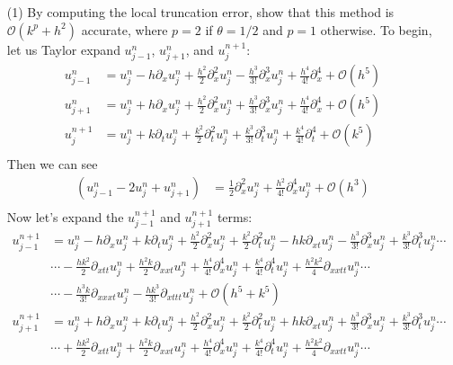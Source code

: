 \documentclass{article}
\begin{document}
\begin{itemize}
    \item[(1)] By computing the local truncation error, show that this method is $\mathcal{O}(k^p + h^2)$ accurate, where $p = 2$ if $\theta = 1/2$ and $p = 1$ otherwise.
    \newline\newline
    To begin, let us Taylor expand $u_{j-1}^n$, $u_{j+1}^n$, and $u_j^{n+1}$:
    \begin{align*}
        u_{j-1}^n &= u_j^n - h\partial_xu_j^n + \frac{h^2}{2}\partial_x^2u_j^n - \frac{h^3}{3!}\partial_x^3u_j^n + \frac{h^4}{4!}\partial_x^4 + \mathcal{O}(h^5) \\
        u_{j+1}^n &= u_j^n + h\partial_xu_j^n + \frac{h^2}{2}\partial_x^2u_j^n + \frac{h^3}{3!}\partial_x^3u_j^n + \frac{h^4}{4!}\partial_x^4 + \mathcal{O}(h^5) \\
        u_j^{n+1} &= u_j^n + k\partial_tu_j^n + \frac{k^2}{2}\partial_t^2u_j^n + \frac{k^3}{3!}\partial_t^3u_j^n + \frac{k^4}{4!}\partial_t^4 + \mathcal{O}(k^5) \\
    \end{align*}
    Then we can see
    \begin{align*}
        (u_{j-1}^n - 2u_j^n + u_{j+1}^n) &= \frac{1}{2}\partial_x^2u_j^n + \frac{h^2}{4!}\partial_x^4u_j^n + \mathcal{O}(h^3) \\
    \end{align*}
    Now let's expand the $u_{j-1}^{n+1}$ and $u_{j+1}^{n+1}$ terms:
    \begin{align*}
        u_{j-1}^{n+1} &= u_j^n - h\partial_xu_j^n + k\partial_tu_j^n + \frac{h^2}{2}\partial_x^2u_j^n + \frac{k^2}{2}\partial_t^2u_j^n - hk\partial_{xt}u_j^n - \frac{h^3}{3!}\partial_x^3u_j^n + \frac{k^3}{3!}\partial_t^3u_j^n \cdots \\
        &\cdots - \frac{hk^2}{2}\partial_{xtt}u_j^n + \frac{h^2k}{2}\partial_{xxt}u_j^n + \frac{h^4}{4!}\partial_x^4u_j^n + \frac{k^4}{4!}\partial_t^4u_j^n + \frac{h^2k^2}{4}\partial_{xxtt}u_j^n \cdots \\
        &\cdots - \frac{h^3k}{3!}\partial_{xxxt}u_j^n - \frac{hk^3}{3!}\partial_{xttt}u_j^n + \mathcal{O}(h^5 + k^5) \\
        u_{j+1}^{n+1} &= u_j^n + h\partial_xu_j^n + k\partial_tu_j^n + \frac{h^2}{2}\partial_x^2u_j^n + \frac{k^2}{2}\partial_t^2u_j^n + hk\partial_{xt}u_j^n + \frac{h^3}{3!}\partial_x^3u_j^n + \frac{k^3}{3!}\partial_t^3u_j^n \cdots \\
        &\cdots + \frac{hk^2}{2}\partial_{xtt}u_j^n + \frac{h^2k}{2}\partial_{xxt}u_j^n + \frac{h^4}{4!}\partial_x^4u_j^n + \frac{k^4}{4!}\partial_t^4u_j^n + \frac{h^2k^2}{4}\partial_{xxtt}u_j^n \cdots \\

\end{align*}
\end{itemize}
\end{document}
